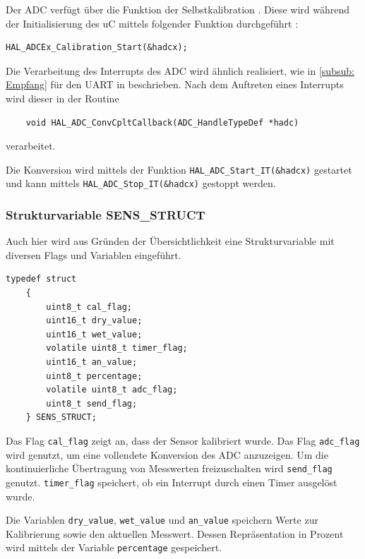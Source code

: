   Der \ac{ADC} verfügt über die Funktion der Selbstkalibration \citep{STM32_Ref}. Diese wird während der Initialisierung des \ac{uC} mittels folgender Funktion durchgeführt \citep{HAL_Description}:
  \begin{lstlisting}[caption={\textit{ADC Kalibrierung}}]
    HAL_ADCEx_Calibration_Start(&hadcx);      
  \end{lstlisting}

  \newpage

  Die Verarbeitung des  Interrupts des \ac{ADC} wird ähnlich realisiert, wie in \ref{subsub: Empfang} für den \ac{UART} in beschrieben. Nach dem Auftreten eines 
  Interrupts wird dieser in der Routine
  \begin{lstlisting}
    void HAL_ADC_ConvCpltCallback(ADC_HandleTypeDef *hadc)
  \end{lstlisting}  
  verarbeitet. 

  \smallskip

  Die Konversion wird mittels der Funktion \lstinline!HAL_ADC_Start_IT(&hadcx)! gestartet und kann mittels \lstinline!HAL_ADC_Stop_IT(&hadcx)! gestoppt werden.

  \subsubsection{Strukturvariable SENS\_STRUCT}
  Auch hier wird aus Gründen der Übersichtlichkeit eine Strukturvariable mit diversen Flags und Variablen eingeführt.
  \begin{lstlisting}[caption={\textit{Sensor Strukturvariable}}]
    typedef struct
    {
        uint8_t cal_flag;						
        uint16_t dry_value;			
        uint16_t wet_value;			
        volatile uint8_t timer_flag;	
        uint16_t an_value;			
        uint8_t percentage;			
        volatile uint8_t adc_flag;	
        uint8_t send_flag;			 
    } SENS_STRUCT;
  \end{lstlisting}

  Das Flag \lstinline!cal_flag! zeigt an, dass der Sensor kalibriert wurde. Das Flag \lstinline!adc_flag! wird genutzt, um eine vollendete Konversion des \ac{ADC} anzuzeigen.
  Um die kontinuierliche Übertragung von Messwerten freizuschalten wird \lstinline!send_flag! genutzt. \lstinline!timer_flag! speichert, ob ein Interrupt durch einen
  Timer ausgelöst wurde.

  \smallskip
  Die Variablen \lstinline!dry_value!, \lstinline!wet_value! und \lstinline!an_value! speichern Werte zur Kalibrierung sowie den aktuellen Messwert. Dessen Repräsentation
  in Prozent wird mittels der Variable \lstinline!percentage! gespeichert.

